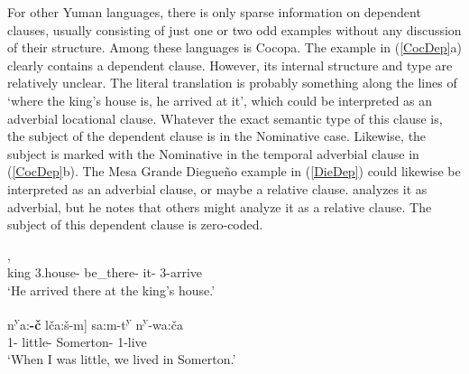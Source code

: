 For other Yuman languages, there is only sparse information on dependent clauses, usually consisting of just one or two odd examples without any discussion of their structure. 
Among these languages is Cocopa.
The example in (\ref{CocDep}a) clearly contains a dependent clause. 
However, its internal structure and type are relatively unclear.
The literal translation is probably something along the lines of `where the king's house is, he arrived at it', which could be interpreted as an adverbial locational clause. 
Whatever the exact semantic type of this clause is, the subject of the dependent clause is in the Nominative  case. 
Likewise, the subject is marked with the Nominative  in the temporal adverbial clause in (\ref{CocDep}b).
The Mesa Grande Diegue\~no example in (\ref{DieDep}) could likewise be interpreted as an adverbial clause, or maybe a relative clause.
\citet[135]{Gorbet:1976} analyzes it as adverbial, but he notes that others might analyze it as a relative clause.
The subject of this dependent clause is zero-coded.

\begin{exe}\ex\label{CocDep}
\begin{xlist} 
\ex\gll  {\rm[}  \textipa{\textsubdot say\'a-m}{\rm]},  \\
king 3\sg{}.house-\nom{} be\_there-\dsbj{} it-\loc{} 3-arrive\\
\glt `He arrived there at the king's house.' %

\ex\gll  {\rm[}\textglotstop n\textsuperscript{y}a:\textbf{-\v c} l\v ca:\v s-m{\rm]} sa:m-t\textsuperscript{y} n\textsuperscript{y}-\textschwa wa:\v ca\\
1\sg{}-\nom{} little-\dsbj{} Somerton-\loc{} 1-live\\
\glt `When I was little, we lived in Somerton.'
\end{xlist}
\end{exe} %

